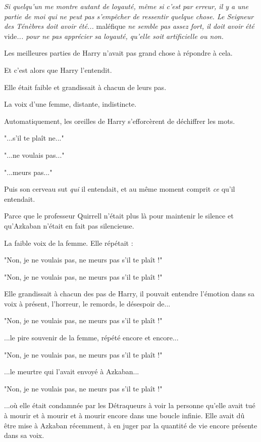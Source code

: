 \emph{Si quelqu'un me montre autant de loyauté, même si c'est par erreur, il y a une partie de moi qui ne peut pas s'empêcher de ressentir quelque chose. Le Seigneur des Ténèbres doit avoir été... } maléfique\emph{ ne semble pas assez fort, il doit avoir été } vide\emph{... pour ne pas apprécier sa loyauté, qu'elle soit artificielle ou non.} 

Les meilleures parties de Harry n'avait pas grand chose à répondre à cela.

Et c'est alors que Harry l'entendit.

Elle était faible et grandissait à chacun de leurs pas.

La voix d'une femme, distante, indistincte.

Automatiquement, les oreilles de Harry s'efforcèrent de déchiffrer les mots.

"...s'il te plaît ne..."

"...ne voulais pas..."

"...meurs pas..."

Puis son cerveau sut \emph{qui}  il entendait, et au même moment comprit \emph{ce}  qu'il entendait.

Parce que le professeur Quirrell n'était plus là pour maintenir le silence et qu'Azkaban n'était en fait pas silencieuse.

La faible voix de la femme. Elle répétait :

"Non, je ne voulais pas, ne meurs pas s'il te plaît !"

"Non, je ne voulais pas, ne meurs pas s'il te plaît !"

Elle grandissait à chacun des pas de Harry, il pouvait entendre l'émotion dans sa voix à présent, l'horreur, le remords, le désespoir de...

"Non, je ne voulais pas, ne meurs pas s'il te plaît !"

...le pire souvenir de la femme, répété encore et encore...

"Non, je ne voulais pas, ne meurs pas s'il te plaît !"

...le meurtre qui l'avait envoyé à Azkaban...

"Non, je ne voulais pas, ne meurs pas s'il te plaît !"

...où elle était condamnée par les Détraqueurs à voir la personne qu'elle avait tué à mourir et à mourir et à mourir encore dans une boucle infinie. Elle avait dû être mise à Azkaban récemment, à en juger par la quantité de vie encore présente dans sa voix.

